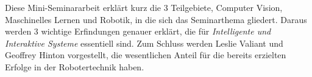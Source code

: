 Diese Mini-Seminararbeit erklärt kurz die 3 Teilgebiete, Computer Vision, Maschinelles Lernen und Robotik, in die sich das Seminarthema gliedert. Daraus werden 3 wichtige Erfindungen genauer erklärt, die für \emph{Intelligente und Interaktive Systeme} essentiell sind. Zum Schluss werden Leslie Valiant und Geoffrey Hinton vorgestellt, die wesentlichen Anteil für die bereits erzielten Erfolge in der Robotertechnik haben.

